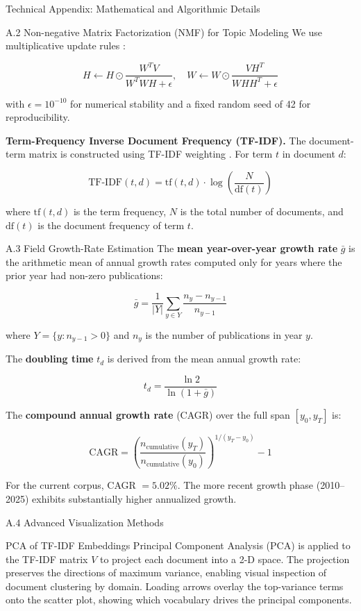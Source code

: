 \documentclass[
  ignorenonframetext,
]{beamer}
\begin{document}
\begin{frame}[fragile]{Technical Appendix: Mathematical and Algorithmic
Details \label{sec:technical_appendix}}
\begin{block}{A.2 Non-negative Matrix Factorization (NMF) for Topic
Modeling}
We use multiplicative update rules \citep{lee1999nmf}:

\[H \leftarrow H \odot \frac{W^T V}{W^T W H + \epsilon}, \quad W \leftarrow W \odot \frac{V H^T}{W H H^T + \epsilon}\]

with \(\epsilon = 10^{-10}\) for numerical stability and a fixed random
seed of 42 for reproducibility.

\textbf{Term-Frequency Inverse Document Frequency (TF-IDF).} The
document-term matrix is constructed using TF-IDF weighting
\citep{salton1975vector}. For term \(t\) in document \(d\):

\[
\text{TF-IDF}(t, d) = \text{tf}(t, d) \cdot \log\!\left(\frac{N}{\text{df}(t)}\right)
\]

where \(\text{tf}(t, d)\) is the term frequency, \(N\) is the total
number of documents, and \(\text{df}(t)\) is the document frequency of
term \(t\).
\end{block}

\begin{block}{A.3 Field Growth-Rate Estimation}
\protect{}\label{a.3-field-growth-rate-estimation}
The \textbf{mean year-over-year growth rate} \(\bar{g}\) is the
arithmetic mean of annual growth rates computed only for years where the
prior year had non-zero publications:

\[
\bar{g} = \frac{1}{|Y|} \sum_{y \in Y} \frac{n_y - n_{y-1}}{n_{y-1}}
\]

where \(Y = \{y : n_{y-1} > 0\}\) and \(n_y\) is the number of
publications in year \(y\).

The \textbf{doubling time} \(t_d\) is derived from the mean annual
growth rate:

\[
t_d = \frac{\ln 2}{\ln(1 + \bar{g})}
\]

The \textbf{compound annual growth rate} (CAGR) over the full span
\([y_0, y_T]\) is:

\[
\text{CAGR} = \left(\frac{n_{\text{cumulative}}(y_T)}{n_{\text{cumulative}}(y_0)}\right)^{1/(y_T - y_0)} - 1
\]

For the current corpus, CAGR \(= 5.02\%\). The more recent growth phase
(2010--2025) exhibits substantially higher annualized growth.
\end{block}

\begin{block}{A.4 Advanced Visualization Methods}
\protect{}\label{a.4-advanced-visualization-methods}
\begin{block}{PCA of TF-IDF Embeddings}
\protect{}\label{pca-of-tf-idf-embeddings}
Principal Component Analysis (PCA) is applied to the TF-IDF matrix \(V\)
to project each document into a 2-D space. The projection preserves the
directions of maximum variance, enabling visual inspection of document
clustering by domain. Loading arrows overlay the top-variance terms onto
the scatter plot, showing which vocabulary drives the principal
components.
\end{block}


\end{block}
\end{frame}
\end{document}
